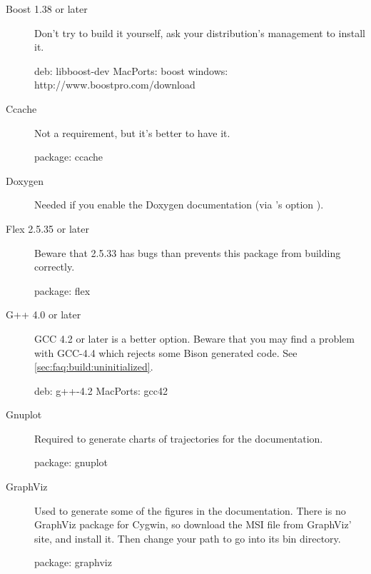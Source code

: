 \begin{description}
\item[Boost 1.38 or later] Don't try to build it yourself, ask your
  distribution's management to install it.
\begin{package}
deb: libboost-dev
MacPorts: boost
windows: http://www.boostpro.com/download
\end{package}

\item[Ccache]
  Not a requirement, but it's better to have it.
\begin{package}
package: ccache
\end{package}

\item[Doxygen] Needed if you enable the Doxygen documentation (via
  's option ).

\item[Flex 2.5.35 or later]
  Beware that 2.5.33 has bugs than prevents this package from building
  correctly.
\begin{package}
package: flex
\end{package}

\item[G++ 4.0 or later] GCC 4.2 or later is a better option.  Beware that
  you may find a problem with GCC-4.4 which rejects some Bison generated
  code.  See \autoref{sec:faq:build:uninitialized}.
\begin{package}
deb: g++-4.2
MacPorts: gcc42
\end{package}

\item[Gnuplot]
  Required to generate charts of trajectories for the documentation.
\begin{package}
package: gnuplot
\end{package}

\item[GraphViz] Used to generate some of the figures in the
  documentation.  There is no GraphViz package for Cygwin, so download
  the MSI file from GraphViz' site, and install it.  Then change your
  path to go into its bin directory.


\begin{package}
package: graphviz
\end{package}


\end{description}
